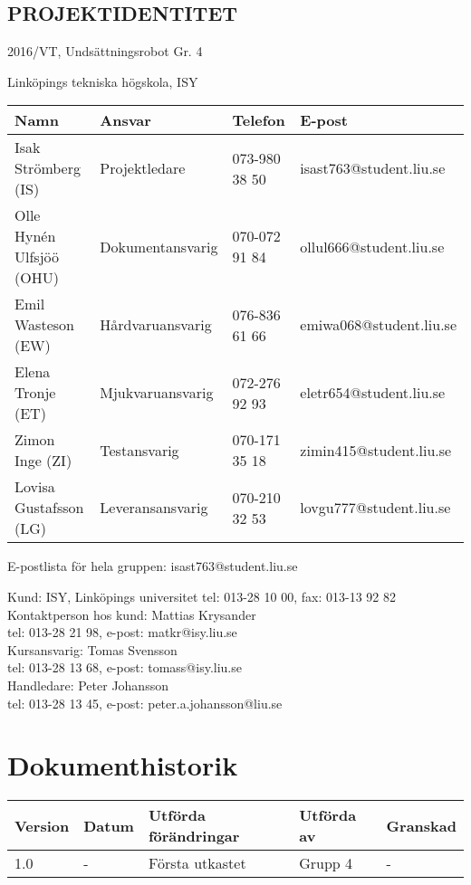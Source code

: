 \documentclass[11pt]{article}
\begin{document}
\pagebreak
\begin{center}

\section*{PROJEKTIDENTITET}
2016/VT, Undsättningsrobot Gr. 4

Linköpings tekniska högskola, ISY
\vspace{5em}

\begin{tabular}{|l|l|l|l|} \hline
\textbf{Namn} & \textbf{Ansvar} & \textbf{Telefon} & \textbf{E-post}  \\ \hline 
Isak Strömberg (IS) & Projektledare & 073-980 38 50 & isast763@student.liu.se \\ \hline
Olle Hynén Ulfsjöö (OHU)& Dokumentansvarig & 070-072 91 84 & ollul666@student.liu.se \\ \hline
Emil Wasteson (EW) & Hårdvaruansvarig & 076-836 61 66 & emiwa068@student.liu.se \\ \hline
Elena Tronje (ET) & Mjukvaruansvarig & 072-276 92 93 & eletr654@student.liu.se \\ \hline
Zimon Inge (ZI) & Testansvarig & 070-171 35 18 & zimin415@student.liu.se \\ \hline
Lovisa Gustafsson (LG) & Leveransansvarig & 070-210 32 53 & lovgu777@student.liu.se \\ \hline
\end{tabular}


E-postlista för hela gruppen: isast763@student.liu.se

\vspace{5em}
Kund: ISY, Linköpings universitet 
tel: 013-28 10 00, fax: 013-13 92 82 \\
Kontaktperson hos kund: Mattias Krysander \\
tel: 013-28 21 98, e-post: matkr@isy.liu.se \\

\vspace{5em}
Kursansvarig:  Tomas Svensson\\
tel: 013-28 13 68, e-post: tomass@isy.liu.se \\
Handledare: Peter Johansson \\
tel: 013-28 13 45, e-post: peter.a.johansson@liu.se
\end{center}
\pagebreak

\tableofcontents

\pagebreak

\section*{Dokumenthistorik}
\begin{table}[h]
\begin{tabular}{|l|l|l|l|l|} \hline

\textbf{Version} & \textbf{Datum} & \textbf{Utförda förändringar} & \textbf{Utförda av} & \textbf{Granskad} \\ \hline
1.0 & - & Första utkastet & Grupp 4 & - \\ \hline
\end{tabular}
\end{table}
\end{document}
